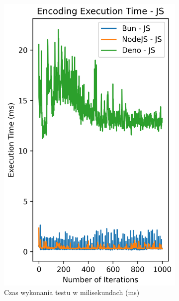 \begin{figure}[H]
  \centering
  \begin{subfigure}[b]{0.42\textwidth}
    \centering
    \includegraphics[width=\textwidth]{Figures/coding/base64_1000_encoding_js_time.png}
    \caption{Czas wykonania testu w milisekundach (ms)}
    \label{fig:encoding_e2_js_time}
  \end{subfigure}
  \begin{subfigure}[b]{0.42\textwidth}
    \centering

\end{subfigure}
\end{figure}
